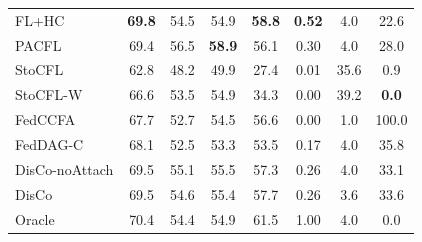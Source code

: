 {\begin{tabular}{lccccccc}
FL+HC & \textbf{69.8} & 54.5 & 54.9 & \textbf{58.8} & \textbf{0.52} & 4.0 & 22.6 \\
PACFL & 69.4 & 56.5 & \textbf{58.9} & 56.1 & 0.30 & 4.0 & 28.0 \\
StoCFL & 62.8 & 48.2 & 49.9 & 27.4 & 0.01 & 35.6 & 0.9 \\
StoCFL-W & 66.6 & 53.5 & 54.9 & 34.3 & 0.00 & 39.2 & \textbf{0.0} \\
FedCCFA & 67.7 & 52.7 & 54.5 & 56.6 & 0.00 & 1.0 & 100.0 \\
FedDAG-C & 68.1 & 52.5 & 53.3 & 53.5 & 0.17 & 4.0 & 35.8 \\
DisCo-noAttach & 69.5 & 55.1 & 55.5 & 57.3 & 0.26 & 4.0 & 33.1 \\
DisCo & 69.5 & 54.6 & 55.4 & 57.7 & 0.26 & 3.6 & 33.6 \\
Oracle & 70.4 & 54.4 & 54.9 & 61.5 & 1.00 & 4.0 & 0.0 \\
\bottomrule
\end{tabular}}
